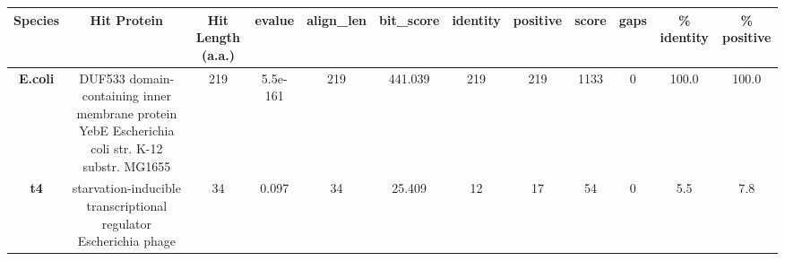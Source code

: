 \begin{tabular}{|c|c|c|c|c|c|c|c|c|c|c|c|} \hline
\textbf{Species} & \textbf{Hit Protein} & \textbf{Hit Length (a.a.)} & \textbf{evalue} & \textbf{align\_len} & \textbf{bit\_score} & \textbf{identity} & \textbf{positive} & \textbf{score} & \textbf{gaps} & \textbf{\% identity} & \textbf{\% positive} \\ \hline
\textbf{E.coli} & DUF533 domain-containing inner membrane protein YebE Escherichia coli str. K-12 substr. MG1655 & 219 & 5.5e-161 & 219 & 441.039 & 219 & 219 & 1133 & 0 & 100.0 & 100.0\\
\textbf{t4} & starvation-inducible transcriptional regulator Escherichia phage  & 34 & 0.097 & 34 & 25.409 & 12 & 17 & 54 & 0 & 5.5 & 7.8\\
\hline \end{tabular}
